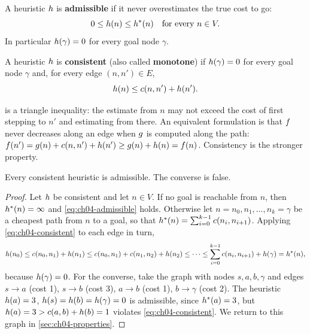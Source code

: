 \begin{definition}
\label{def:ch04-admissible}
A heuristic $h$ is \textbf{admissible} if it never
overestimates the true cost to go:
\begin{equation}
  0 \le h(n) \le h^*(n) \quad \text{for every } n \in V.
  \label{eq:ch04-admissible}
\end{equation}
In particular $h(\gamma) = 0$ for every goal node $\gamma$.
\end{definition}

\begin{definition}
\label{def:ch04-consistent}
A heuristic $h$ is \textbf{consistent} (also
called \textbf{monotone}) if $h(\gamma) = 0$ for
every goal node $\gamma$ and, for every edge $(n, n') \in E$,
\begin{equation}
  h(n) \le c(n, n') + h(n').
  \label{eq:ch04-consistent}
\end{equation}
\end{definition}

 is a triangle inequality: the estimate from $n$ may not
exceed the cost of first stepping to $n'$ and estimating from there. An
equivalent formulation is that $f$ never decreases along an edge when
$g$ is computed along the path: $f(n') = g(n) + c(n, n') +
h(n') \ge g(n) + h(n) = f(n)$. Consistency is the stronger
property.

\begin{lemma}
\label{thm:ch04-consistent-admissible}
Every consistent heuristic is admissible. The converse is false.
\end{lemma}
\begin{proof}
Let $h$ be consistent and let $n \in V$. If no goal is reachable from $n$,
then $h^*(n) = \infty$ and \cref{eq:ch04-admissible} holds. Otherwise let
$n = n_0, n_1, \dots, n_k = \gamma$ be a cheapest path from $n$ to a goal, so that
$h^*(n) = \sum_{i=0}^{k-1} c(n_i, n_{i+1})$. Applying
\cref{eq:ch04-consistent} to each edge in turn,
\[
  h(n_0) \le c(n_0, n_1) + h(n_1)
             \le c(n_0, n_1) + c(n_1, n_2) + h(n_2)
             \le \dots
             \le \sum_{i=0}^{k-1} c(n_i, n_{i+1}) + h(\gamma) = h^*(n),
\]
because $h(\gamma) = 0$. For the converse, take the graph with nodes
$s, a, b, \gamma$ and edges $s \to a$ (cost 1), $s \to b$ (cost 3), $a \to b$
(cost 1), $b \to \gamma$ (cost 2). The heuristic $h(a) = 3$,
$h(s) = h(b) = h(\gamma) = 0$ is admissible, since
$h^*(a) = 3$, but $h(a) = 3 > c(a, b) + h(b) = 1$ violates
\cref{eq:ch04-consistent}. We return to this graph in
\cref{sec:ch04-properties}.
\end{proof}

